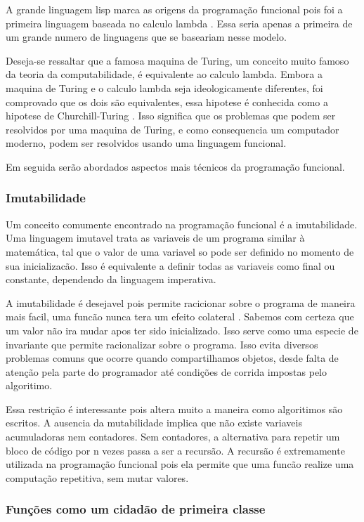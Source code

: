 A grande linguagem lisp marca as origens da programação funcional pois foi a primeira linguagem baseada no calculo lambda \cite{graham}.
Essa seria apenas a primeira de um grande numero de linguagens que se baseariam nesse modelo.

Deseja-se ressaltar que a famosa maquina de Turing, um conceito muito famoso da teoria da computabilidade, é equivalente ao calculo lambda.
Embora a maquina de Turing e o calculo lambda seja ideologicamente diferentes, foi comprovado que os dois são equivalentes, essa hipotese é conhecida como a hipotese de Churchill-Turing \cite{computability}.
Isso significa que os problemas que podem ser resolvidos por uma maquina de Turing, e como consequencia um computador moderno, podem ser resolvidos usando uma linguagem funcional.

Em seguida serão abordados aspectos mais técnicos da programação funcional.

\subsubsection{Imutabilidade}

Um conceito comumente encontrado na programação funcional é a imutabilidade.
Uma linguagem imutavel trata as variaveis de um programa similar à matemática, tal que o valor de uma variavel so pode ser definido no momento de sua inicializacão. 
Isso é equivalente a definir todas as variaveis como final ou constante, dependendo da linguagem imperativa.

A imutabilidade é desejavel pois permite racicionar sobre o programa de maneira mais facil, uma funcão nunca tera um efeito colateral \cite{history}.
Sabemos com certeza que um valor não ira mudar apos ter sido inicializado.
Isso serve como uma especie de invariante que permite racionalizar sobre o programa.
Isso evita diversos problemas comuns que ocorre quando compartilhamos objetos, desde falta de atenção pela parte do programador até condições de corrida impostas pelo algoritimo.

Essa restrição é interessante pois altera muito a maneira como algoritimos são escritos.
A ausencia da mutabilidade implica que não existe variaveis acumuladoras nem contadores.
Sem contadores, a alternativa para repetir um bloco de código por n vezes passa a ser a recursão.
A recursão é extremamente utilizada na programação funcional pois ela permite que uma funcão realize uma computação repetitiva, sem mutar valores.

\subsubsection{Funções como um cidadão de primeira classe}

